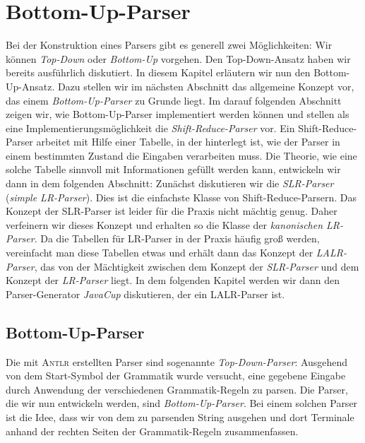 \chapter{Bottom-Up-Parser}
Bei der Konstruktion eines Parsers gibt es generell zwei M\"oglichkeiten:  Wir k\"onnen
\emph{Top-Down} oder \emph{Bottom-Up} vorgehen.  Den Top-Down-Ansatz haben wir bereits
ausf\"uhrlich diskutiert.  In diesem Kapitel erl\"autern wir nun den Bottom-Up-Ansatz.
Dazu stellen wir im n\"achsten Abschnitt das allgemeine Konzept vor, das einem
\textsl{Bottom-Up-Parser} zu Grunde liegt.  
Im darauf folgenden Abschnitt zeigen wir, wie Bottom-Up-Parser implementiert werden k\"onnen
und stellen als eine Implementierungsm\"oglichkeit die \emph{Shift-Reduce-Parser} vor.
Ein Shift-Reduce-Parser arbeitet mit Hilfe einer Tabelle, in der
hinterlegt ist, wie der Parser in einem bestimmten Zustand die Eingaben verarbeiten muss.
Die Theorie, wie eine solche Tabelle sinnvoll mit Informationen gef\"ullt werden kann,
entwickeln wir dann in dem folgenden Abschnitt: Zun\"achst diskutieren wir die
\emph{SLR-Parser} (\emph{simple LR-Parser}).  Dies ist die einfachste Klasse von Shift-Reduce-Parsern.
Das Konzept der SLR-Parser ist leider f\"ur die Praxis nicht m\"achtig genug.  Daher verfeinern wir
dieses Konzept und erhalten so die Klasse der
\emph{kanonischen LR-Parser}.  Da die Tabellen f\"ur LR-Parser in der Praxis
h\"aufig gro{\ss} werden, vereinfacht man diese Tabellen etwas und erh\"alt dann das Konzept der
\emph{LALR-Parser}, das von der M\"achtigkeit zwischen dem Konzept der \emph{SLR-Parser} und dem
Konzept der \emph{LR-Parser} liegt.  In dem folgenden Kapitel werden wir dann den Parser-Generator
\textsl{JavaCup} diskutieren, der ein LALR-Parser ist.

\section{Bottom-Up-Parser}
Die mit \textsc{Antlr} erstellten Parser sind sogenannte \emph{Top-Down-Parser}: Ausgehend von dem
Start-Symbol der Grammatik wurde versucht, eine gegebene Eingabe durch Anwendung der verschiedenen
Grammatik-Regeln zu parsen.  Die Parser, die wir nun entwickeln werden, sind
\emph{Bottom-Up-Parser}.  Bei einem solchen Parser ist die Idee, dass wir von dem zu parsenden
String ausgehen und dort Terminale anhand der rechten Seiten der Grammatik-Regeln zusammenfassen.  


